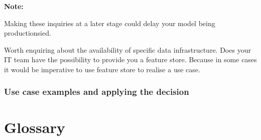 \documentclass[a4paper, 11pt]{book}
\newenvironment{note}{
    \begin{siderule}
        \textbf{Note: }
        }{
    \end{siderule}}
\begin{document}
    \begin{note}
        Making these inquiries at a later stage could delay your model being productionsied.
    \end{note}

    Worth enquiring about the availability of specific data infrastructure.
    Does your IT team have the possibility to provide you a feature store.
    Because in some cases it would be imperative to use feature store to realise a use case.

    \subsection{Use case examples and applying the decision}


    \chapter{Glossary}
\end{document}
